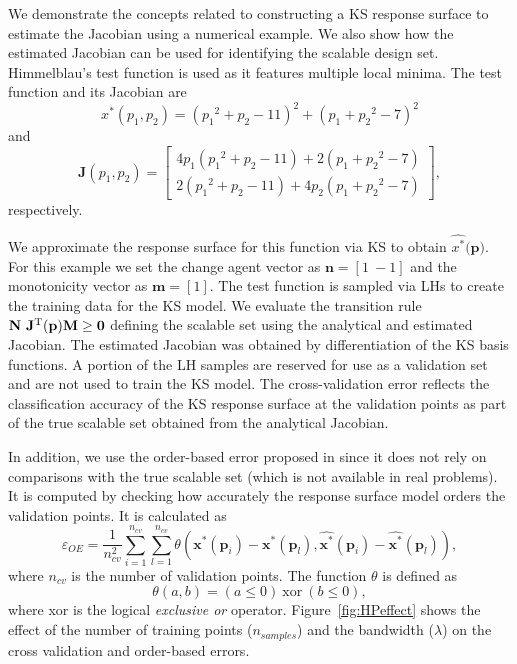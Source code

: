 We demonstrate the concepts related to constructing a \ac{KS} response surface to estimate the Jacobian using a numerical example. We also show how the estimated Jacobian can be used for identifying the scalable design set. Himmelblau's test function is used as it features multiple local minima. The test function and its Jacobian are
\begin{displaymath}
		{x}^*(p_1,p_2) = ({p_1}^{2}+{p_2}-11)^{2}+({p_1}+{p_2}^{2}-7)^{2} 
		\end{displaymath}
		and
	\begin{displaymath}	
		\mathbf{J}(p_1,p_2) = \begin{bmatrix}
			4{p_1}({p_1}^2 + {p_2} - 11) + 2({p_1} + {p_2}^2 -7) \\ 
			2({p_1}^2 + {p_2} - 11) + 4{p_2}({p_1} + {p_2}^2 -7) 
	\end{bmatrix},
	\end{displaymath}
	respectively.%

We approximate the response surface for this function via \ac{KS} to obtain $\hat{{x}^*}(\mathbf{p)}$. For this example we set the change agent vector as $\mathbf{n} = \left[1~-1\right]$ and the monotonicity vector as $\mathbf{m} = \left[1\right]$. The test function is sampled via \acp{LH} to create the training data for the \ac{KS} model. We evaluate the transition rule $\mathbf{N}~\mathbf{J}^{\text T}(\mathbf{p})\mathbf{M} \ge \mathbf{0}$ defining the scalable set using the analytical and estimated Jacobian. The estimated Jacobian was obtained by differentiation of the \ac{KS} basis functions. A portion of the \ac{LH} samples are reserved for use as a validation set and are not used to train the \ac{KS} model. The cross-validation error reflects the classification accuracy of the \ac{KS} response surface at the validation points as part of the true scalable set obtained from the analytical Jacobian.

In addition, we use the order-based error proposed in \cite{Audet2018} since it does not rely on comparisons with the true scalable set (which is not available in real problems). It is computed by checking how accurately the response surface model orders the validation points. It is calculated as 
%
\begin{equation}
    \label{eq:oeobjective}
	\varepsilon_{OE} = \frac{1}{n_{cv}^2} \sum_{i=1}^{n_{cv}} \sum_{l=1}^{n_{cv}} \theta\left(\mathbf{x}^*(\mathbf{p}_i) - \mathbf{x}^*(\mathbf{p}_l),\hat{\mathbf{x}^*}(\mathbf{p}_i) - \hat{\mathbf{x}^*}(\mathbf{p}_l)\right),
\end{equation}
%
where $n_{cv}$ is the number of validation points. The function $\theta$ is defined as
%
\begin{equation}
    \label{eq:theta}
    \theta\left(a,b\right) = \left(a \le 0\right)~\textrm{xor}~\left(b \le 0\right),
\end{equation}
%
where xor is the logical \textit{exclusive or} operator.
Figure~\ref{fig:HPeffect} shows the effect of the number of training points ($n_{samples}$) and the bandwidth ($\lambda$) on the cross validation and order-based errors.

